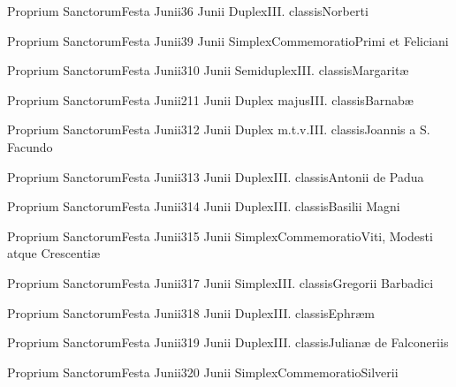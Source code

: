 \documentclass[psalterium-feriale.tex]{subfiles}
\begin{document}
	{Proprium Sanctorum}{Festa Junii}{3}{6 Junii}
	{Duplex}{III. classis}{Norberti}
	{}
	{}
\COPOcdRubric

	{Proprium Sanctorum}{Festa Junii}{3}{9 Junii}
	{Simplex}{Commemoratio}{Primi et Feliciani}
	{}
	{}
\PMEXadRubric

	{Proprium Sanctorum}{Festa Junii}{3}{10 Junii}
	{Semiduplex}{III. classis}{Margaritæ}
	{}
	{}
\MUNNaRubric

	{Proprium Sanctorum}{Festa Junii}{2}{11 Junii}
	{Duplex majus}{III. classis}{Barnabæ}
	{\psalmodiapropria}
	{}

	{Proprium Sanctorum}{Festa Junii}{3}{12 Junii}
	{Duplex m.t.v.}{III. classis}{Joannis a S. Facundo}
	{}
	{}
\COPObRubric

	{Proprium Sanctorum}{Festa Junii}{3}{13 Junii}
	{Duplex}{III. classis}{Antonii de Padua}
	{}
	{}
\COPObRubric

	{Proprium Sanctorum}{Festa Junii}{3}{14 Junii}
	{Duplex}{III. classis}{Basilii Magni}
	{}
	{}
\COPOcRubric

	{Proprium Sanctorum}{Festa Junii}{3}{15 Junii}
	{Simplex}{Commemoratio}{Viti, Modesti atque Crescentiæ\linebreak\null}
	{}
	{}
\PMEXaRubric

	{Proprium Sanctorum}{Festa Junii}{3}{17 Junii}
	{Simplex}{III. classis}{Gregorii Barbadici}
	{}
	{}
\COPOaRubric

	{Proprium Sanctorum}{Festa Junii}{3}{18 Junii}
	{Duplex}{III. classis}{Ephræm}
	{}
	{}
\COPOcRubric

	{Proprium Sanctorum}{Festa Junii}{3}{19 Junii}
	{Duplex}{III. classis}{Julianæ de Falconeriis}
	{}
	{}

	{Proprium Sanctorum}{Festa Junii}{3}{20 Junii}
	{Simplex}{Commemoratio}{Silverii}
	{}
	{}
\UMEXaRubric
\end{document}
